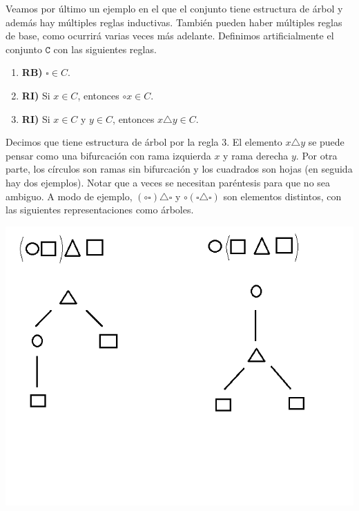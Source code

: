 \documentclass[a4paper, 12pt]{report}
\theoremstyle{definition}
\begin{document}
Veamos por último un ejemplo en el que el conjunto tiene estructura de árbol y además hay múltiples reglas inductivas. También pueden haber múltiples reglas de base, como ocurrirá varias veces más adelante. Definimos artificialmente el conjunto $\mathtt{C}$ con las siguientes reglas.
\begin{enumerate}
	\item \textbf{RB)} $\square\in C$.
	\item \textbf{RI)} Si $x\in C$, entonces $\circ x\in C$.
	\item \textbf{RI)} Si $x\in C$ y $y\in C$, entonces $x\triangle y\in C$.
\end{enumerate}
Decimos que tiene estructura de árbol por la regla 3. El elemento $x\triangle y$ se puede pensar como una bifurcación con rama izquierda $x$ y rama derecha $y$. Por otra parte, los círculos son ramas sin bifurcación y los cuadrados son hojas (en seguida hay dos ejemplos). Notar que a veces se necesitan paréntesis para que no sea ambiguo. A modo de ejemplo, $(\circ \square)\triangle\square$ y $\circ(\square\triangle\square)$ son elementos distintos, con las siguientes representaciones como árboles.

\includegraphics[scale=0.6]{figPaint.png}
\end{document}
